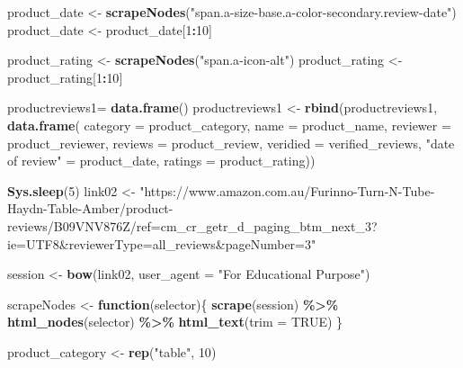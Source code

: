 \documentclass[
]{article}
\newenvironment{Shaded}{\begin{snugshade}}{\end{snugshade}}
\newcommand{\AttributeTok}[1]{\textcolor[rgb]{0.13,0.29,0.53}{#1}}
\newcommand{\ConstantTok}[1]{\textcolor[rgb]{0.56,0.35,0.01}{#1}}
\newcommand{\ControlFlowTok}[1]{\textcolor[rgb]{0.13,0.29,0.53}{\textbf{#1}}}
\newcommand{\DecValTok}[1]{\textcolor[rgb]{0.00,0.00,0.81}{#1}}
\newcommand{\FunctionTok}[1]{\textcolor[rgb]{0.13,0.29,0.53}{\textbf{#1}}}
\newcommand{\NormalTok}[1]{#1}
\newcommand{\OtherTok}[1]{\textcolor[rgb]{0.56,0.35,0.01}{#1}}
\newcommand{\SpecialCharTok}[1]{\textcolor[rgb]{0.81,0.36,0.00}{\textbf{#1}}}
\newcommand{\StringTok}[1]{\textcolor[rgb]{0.31,0.60,0.02}{#1}}
\begin{document}
\begin{Shaded}
\begin{Highlighting}[]
\NormalTok{  product\_date }\OtherTok{\textless{}{-}} \FunctionTok{scrapeNodes}\NormalTok{(}\StringTok{"span.a{-}size{-}base.a{-}color{-}secondary.review{-}date"}\NormalTok{)}
\NormalTok{  product\_date }\OtherTok{\textless{}{-}}\NormalTok{ product\_date[}\DecValTok{1}\SpecialCharTok{:}\DecValTok{10}\NormalTok{]}
  
\NormalTok{  product\_rating }\OtherTok{\textless{}{-}} \FunctionTok{scrapeNodes}\NormalTok{(}\StringTok{"span.a{-}icon{-}alt"}\NormalTok{)}
\NormalTok{  product\_rating }\OtherTok{\textless{}{-}}\NormalTok{ product\_rating[}\DecValTok{1}\SpecialCharTok{:}\DecValTok{10}\NormalTok{]}
  
\NormalTok{  productreviews1}\OtherTok{=} \FunctionTok{data.frame}\NormalTok{()}
\NormalTok{  productreviews1 }\OtherTok{\textless{}{-}} \FunctionTok{rbind}\NormalTok{(productreviews1, }\FunctionTok{data.frame}\NormalTok{(}
                      \AttributeTok{category =}\NormalTok{ product\_category,}
                      \AttributeTok{name =}\NormalTok{ product\_name,}
                      \AttributeTok{reviewer =}\NormalTok{ product\_reviewer,}
                      \AttributeTok{reviews =}\NormalTok{ product\_review,}
                      \AttributeTok{veridied =}\NormalTok{ verified\_reviews,}
                      \StringTok{"date of review"} \OtherTok{=}\NormalTok{ product\_date,}
                      \AttributeTok{ratings =}\NormalTok{ product\_rating))}

  
 \FunctionTok{Sys.sleep}\NormalTok{(}\DecValTok{5}\NormalTok{)}
\NormalTok{link02 }\OtherTok{\textless{}{-}} \StringTok{"https://www.amazon.com.au/Furinno{-}Turn{-}N{-}Tube{-}Haydn{-}Table{-}Amber/product{-}reviews/B09VNV876Z/ref=cm\_cr\_getr\_d\_paging\_btm\_next\_3?ie=UTF8\&reviewerType=all\_reviews\&pageNumber=3"}


\NormalTok{  session }\OtherTok{\textless{}{-}} \FunctionTok{bow}\NormalTok{(link02,}
               \AttributeTok{user\_agent =} \StringTok{"For Educational Purpose"}\NormalTok{)}

\NormalTok{  scrapeNodes }\OtherTok{\textless{}{-}} \ControlFlowTok{function}\NormalTok{(selector)\{}
    \FunctionTok{scrape}\NormalTok{(session) }\SpecialCharTok{\%\textgreater{}\%}
      \FunctionTok{html\_nodes}\NormalTok{(selector) }\SpecialCharTok{\%\textgreater{}\%}
      \FunctionTok{html\_text}\NormalTok{(}\AttributeTok{trim =} \ConstantTok{TRUE}\NormalTok{)}
\NormalTok{  \}}

\NormalTok{  product\_category }\OtherTok{\textless{}{-}} \FunctionTok{rep}\NormalTok{(}\StringTok{"table"}\NormalTok{, }\DecValTok{10}\NormalTok{)}


\end{Highlighting}
\end{Shaded}
\end{document}
